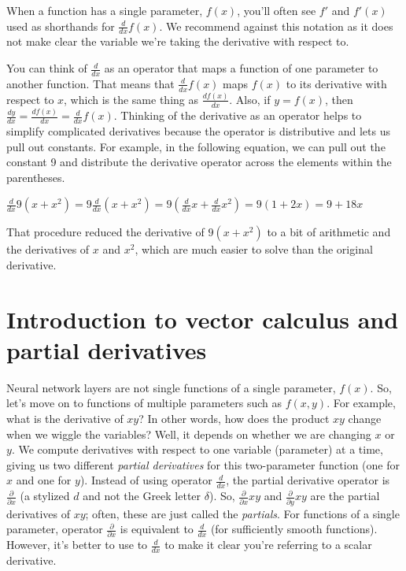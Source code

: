\documentclass[11pt]{article}
\begin{document}
When a function has a single parameter, $f(x)$, you'll often see $f'$ and $f'(x)$ used as shorthands for $\frac{d}{dx}f(x)$. We recommend against this notation as it does not make clear the variable we're taking the derivative with respect to. 

You can think of $\frac{d}{dx}$ as an operator that maps a function of one parameter to another function.  That means that $\frac{d}{dx} f(x)$ maps $f(x)$ to its derivative with respect to $x$, which is the same thing as $\frac{df(x)}{dx}$. Also, if $y = f(x)$, then $\frac{dy}{dx} = \frac{df(x)}{dx} = \frac{d}{dx}f(x)$. Thinking of the derivative as an operator helps to simplify complicated derivatives because the operator is distributive and lets us pull out constants. For example, in the following equation, we can pull out the constant 9 and distribute the derivative operator across the elements within the parentheses.

$\frac{d}{dx} 9(x + x^2) = 9 \frac{d}{dx}(x + x^2) = 9 (\frac{d}{dx}x + \frac{d}{dx}x^2) = 9(1 + 2x) = 9 + 18x$

That procedure reduced the derivative of $9(x + x^2)$ to a bit of arithmetic and the derivatives of $x$ and $x^2$, which are much easier to solve than the original derivative.

\section{Introduction to vector calculus and partial derivatives}

Neural network layers are not single functions of a single parameter, $f(x)$. So, let's move on to functions of multiple parameters such as $f(x,y)$. For example, what is the derivative of $xy$? In other words, how does the product $xy$ change when we wiggle the variables? Well, it depends on whether we are changing $x$ or $y$.  We compute derivatives with respect to one variable (parameter) at a time, giving us two different {\em partial derivatives} for this two-parameter function (one for $x$ and one for $y$).  Instead of using operator $\frac{d}{dx}$, the partial derivative operator is  $\frac{\partial}{\partial x}$ (a stylized $d$ and not the Greek letter $\delta$). So, $\frac{\partial }{\partial x}xy$ and $\frac{\partial }{\partial y}xy$ are the partial derivatives of $xy$; often, these are just called the {\em partials}.  For functions of a single parameter, operator $\frac{\partial}{\partial x}$ is equivalent to $\frac{d}{dx}$ (for sufficiently smooth functions). However, it's better to use to $\frac{d}{dx}$ to make it clear you're referring to a scalar derivative.
\end{document}
